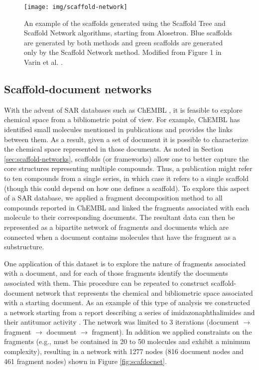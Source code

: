 \documentclass[]{book}
\begin{document}
\begin{figure}[h]
  \centering
  \texttt{[image: img/scaffold-network]}
  \caption{An example of the scaffolds generated using
  the Scaffold Tree and Scaffold Network algorithms, starting from
  Alosetron. Blue scaffolds are generated by both methods and green
  scaffolds are generated only by the Scaffold Network
  method. Modified from Figure 1 in Varin et al. \cite{Varin:2011ve}.}
  \label{fig:scaffnet}
\end{figure}

\subsection{Scaffold-document networks}
\label{sec:scaff-docum-netw}

With the advent of SAR databases such as ChEMBL \cite{Gaulton:2012jl},
it is feasible to explore chemical space from a bibliometric point of
view. For example, ChEMBL has identified small molecules mentioned in
publications and provides the links between them. As a result, given a
set of document it is possible to characterize the chemical space
represented in those documents. As noted in Section
\ref{sec:scaffold-networks}, scaffolds (or frameworks) allow one to
better capture the core structures representing multiple
compounds. Thus, a publication might refer to ten compounds from a
single series, in which case it refers to a single scaffold (though
this could depend on how one defines a scaffold). To explore this
aspect of a SAR database, we applied a fragment decomposition method
to all compounds reported in ChEMBL and linked the fragments
associated with each molecule to their corresponding documents. The
resultant data can then be represented as a bipartite network of
fragments and documents which are connected when a document contains
molecules that have the fragment as a substructure. 

One application of this dataset is to explore the nature of fragments
associated with a document, and for each of those fragments identify
the documents associated with them. This procedure can be repeated to
construct scaffold-document network that represents the chemical and
bibliometric space associated with a starting document. As an example
of this type of analysis we constructed a network starting from a
report describing a series of imidazonaphthalimides and their
antitumor activity \cite{Brana:2002pr}. The network was limited to 3
iterations (document $\rightarrow$ fragment $\rightarrow$ document
$\rightarrow$ fragment). In addition we applied constraints on the
fragments (e.g., must be contained in 20 to 50 molecules and exhibit a
minimum complexity), resulting in a network with 1277 nodes (816
document nodes and 461 fragment nodes) shown in Figure
\ref{fig:scafdocnet}. 
\end{document}
